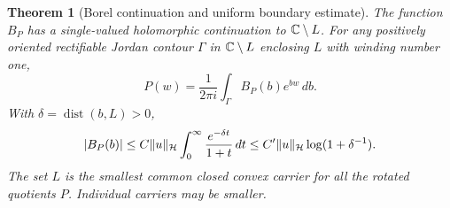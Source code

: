 \documentclass[11pt,a4paper]{article}
\numberwithin{equation}{section}
\newtheorem{theorem}{Theorem}[section]
\theoremstyle{definition}\newtheorem{definition}[theorem]{Definition}
\theoremstyle{remark}\newtheorem{remark}[theorem]{Remark}
\newcommand{\Hh}{\mathcal H}\newcommand{\Hw}{\mathcal H}
\begin{document}
\begin{theorem}[Borel continuation and uniform boundary estimate]\label{d:thm:Borel}
The function $B_P$ has a single-valued holomorphic continuation to $\mathbb C\setminus L$. For any positively oriented rectifiable Jordan contour $\Gamma$ in $\mathbb C\setminus L$ enclosing $L$ with winding number one,
\begin{equation}\label{d:eq:B-inversion}
 P(w)=\frac1{2\pi i}\int_\Gamma B_P(b)e^{bw}\,db.
\end{equation}
With $\delta=\operatorname{dist}(b,L)>0$,
\begin{equation}\label{d:eq:B-bound}
 |B_P(b)|\le C\norm{u}_{\Hh}
       \int_0^\infty\frac{e^{-\delta t}}{1+t}\,dt
 \le C'\norm{u}_{\Hh}\log(1+\delta^{-1}).
\end{equation}
The set $L$ is the smallest common closed convex carrier for all the rotated quotients $P$. Individual carriers may be smaller.
\end{theorem}
\end{document}
